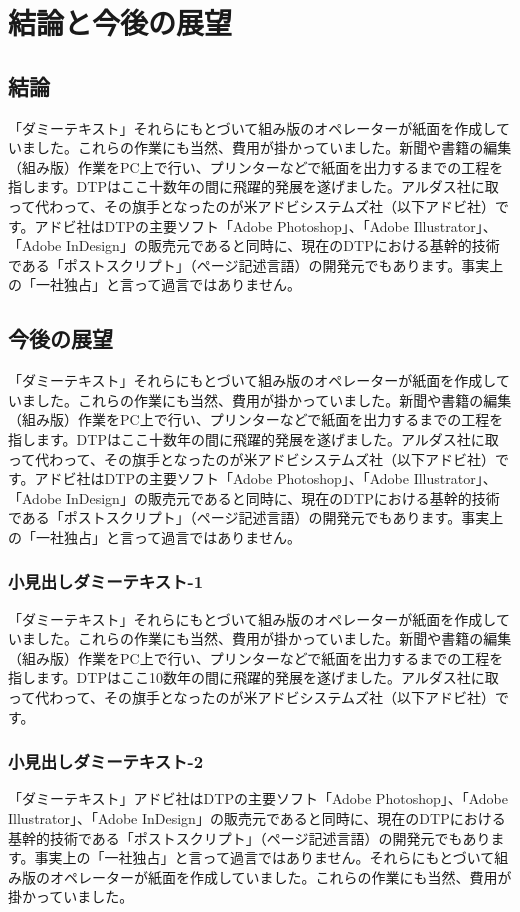 \documentclass{cuxarticle}
\begin{document}
\chapter{結論と今後の展望}
\section{結論}
「ダミーテキスト」それらにもとづいて組み版のオペレーターが紙面を作成していました。これらの作業にも当然、費用が掛かっていました。新聞や書籍の編集（組み版）作業をPC上で行い、プリンターなどで紙面を出力するまでの工程を指します。DTPはここ十数年の間に飛躍的発展を遂げました。アルダス社に取って代わって、その旗手となったのが米アドビシステムズ社（以下アドビ社）です。アドビ社はDTPの主要ソフト「Adobe Photoshop」、「Adobe Illustrator」、「Adobe InDesign」の販売元であると同時に、現在のDTPにおける基幹的技術である「ポストスクリプト」（ページ記述言語）の開発元でもあります。事実上の「一社独占」と言って過言ではありません。

\section{今後の展望}
「ダミーテキスト」それらにもとづいて組み版のオペレーターが紙面を作成していました。これらの作業にも当然、費用が掛かっていました。新聞や書籍の編集（組み版）作業をPC上で行い、プリンターなどで紙面を出力するまでの工程を指します。DTPはここ十数年の間に飛躍的発展を遂げました。アルダス社に取って代わって、その旗手となったのが米アドビシステムズ社（以下アドビ社）です。アドビ社はDTPの主要ソフト「Adobe Photoshop」、「Adobe Illustrator」、「Adobe InDesign」の販売元であると同時に、現在のDTPにおける基幹的技術である「ポストスクリプト」（ページ記述言語）の開発元でもあります。事実上の「一社独占」と言って過言ではありません。

\subsection{小見出しダミーテキスト-1}
「ダミーテキスト」それらにもとづいて組み版のオペレーターが紙面を作成していました。これらの作業にも当然、費用が掛かっていました。新聞や書籍の編集（組み版）作業をPC上で行い、プリンターなどで紙面を出力するまでの工程を指します。DTPはここ10数年の間に飛躍的発展を遂げました。アルダス社に取って代わって、その旗手となったのが米アドビシステムズ社（以下アドビ社）です。

\subsection{小見出しダミーテキスト-2}
「ダミーテキスト」アドビ社はDTPの主要ソフト「Adobe Photoshop」、「Adobe Illustrator」、「Adobe InDesign」の販売元であると同時に、現在のDTPにおける基幹的技術である「ポストスクリプト」（ページ記述言語）の開発元でもあります。事実上の「一社独占」と言って過言ではありません。それらにもとづいて組み版のオペレーターが紙面を作成していました。これらの作業にも当然、費用が掛かっていました。
\end{document}
